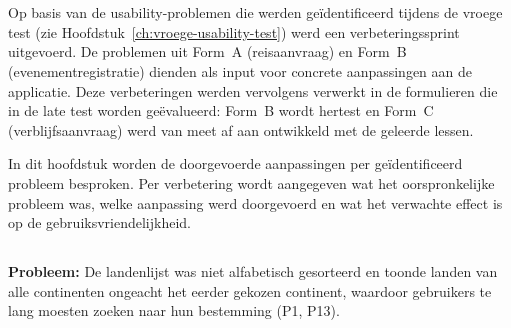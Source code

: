 
\chapter{}%
\label{ch:ontwerpverbeteringen}

\section{}

Op basis van de usability-problemen die werden geïdentificeerd tijdens de vroege test (zie Hoofdstuk~\ref{ch:vroege-usability-test}) werd een verbeteringssprint uitgevoerd. De problemen uit Form~A (reisaanvraag) en Form~B (evenementregistratie) dienden als input voor concrete aanpassingen aan de applicatie. Deze verbeteringen werden vervolgens verwerkt in de formulieren die in de late test worden geëvalueerd: Form~B wordt hertest en Form~C (verblijfsaanvraag) werd van meet af aan ontwikkeld met de geleerde lessen.

In dit hoofdstuk worden de doorgevoerde aanpassingen per geïdentificeerd probleem besproken. Per verbetering wordt aangegeven wat het oorspronkelijke probleem was, welke aanpassing werd doorgevoerd en wat het verwachte effect is op de gebruiksvriendelijkheid.

\section{}

\subsection{}

\textbf{Probleem:} De landenlijst was niet alfabetisch gesorteerd en toonde landen van alle continenten ongeacht het eerder gekozen continent, waardoor gebruikers te lang moesten zoeken naar hun bestemming (P1, P13).

